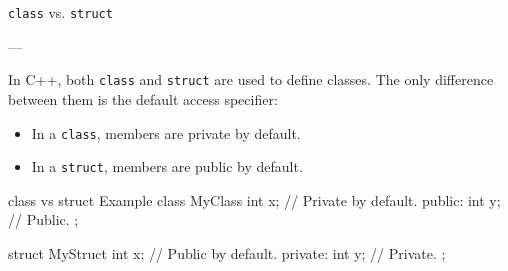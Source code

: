 \begin{definitionblock}
    
    \texttt{class} vs. \texttt{struct}
    
    ---
    
    In C++, both \texttt{class} and \texttt{struct} are used to define classes. The only difference between them is the default access specifier:
    
    \begin{itemize}
        \item In a \texttt{class}, members are private by default.
        \item In a \texttt{struct}, members are public by default.
    \end{itemize}

\end{definitionblock}
    
\begin{neonlisting}[language=C++]{class vs struct Example}
class MyClass {
    int x; // Private by default.
public:
    int y; // Public.
};

struct MyStruct {
    int x; // Public by default.
private:
    int y; // Private.
};
\end{neonlisting}